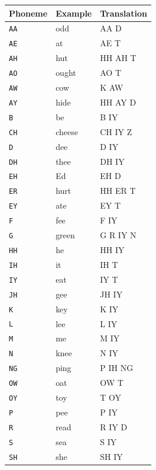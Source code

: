 \documentclass[10pt,a4paper]{article}
\begin{document}
\begin{enumerate}
\begin{enumerate}
\begin{table}[htbp]
  \centering
  \begin{adjustbox}{width=.5\textwidth}
    \begin{tabular}{lll}
      \toprule
      \textbf{Phoneme} & \textbf{Example} & \textbf{Translation} \\
      \midrule
      \texttt{AA} &	odd  &   AA D \\
      \texttt{AE} &	at &	AE T \\
      \texttt{AH} &	hut &	HH AH T \\ 
      \texttt{AO} &	ought &	AO T \\ 
      \texttt{AW} &	cow	 & K AW \\
      \texttt{AY} &	hide &	HH AY D \\
      \texttt{B} & 	be	& B IY \\
      \texttt{CH} &	cheese	& CH IY Z \\
      \texttt{D} & 	dee	& D IY \\
      \texttt{DH} &	thee	& DH IY \\
      \texttt{EH} &	Ed	& EH D \\
      \texttt{ER} &	hurt	& HH ER T \\
      \texttt{EY} &	ate	& EY T \\
      \texttt{F} & 	fee	& F IY \\
      \texttt{G} & 	green	& G R IY N \\
      \texttt{HH} &	he	& HH IY \\
      \texttt{IH} &	it	& IH T \\
      \texttt{IY} &	eat	& IY T \\
      \texttt{JH} &	gee	& JH IY \\
      \texttt{K} & 	key	& K IY \\
      \texttt{L} & 	lee	& L IY \\
      \texttt{M} & 	me	& M IY \\
      \texttt{N} & 	knee	& N IY \\
      \texttt{NG} &	ping	& P IH NG \\
      \texttt{OW} &	oat	& OW T \\
      \texttt{OY} &	toy	& T OY \\
      \texttt{P} & 	pee	& P IY \\
      \texttt{R} & 	read	& R IY D \\
      \texttt{S} & 	sea	& S IY \\
      \texttt{SH} &	she	& SH IY \\

\end{tabular}
\end{adjustbox}
\end{table}
\end{enumerate}
\end{enumerate}
\end{document}
